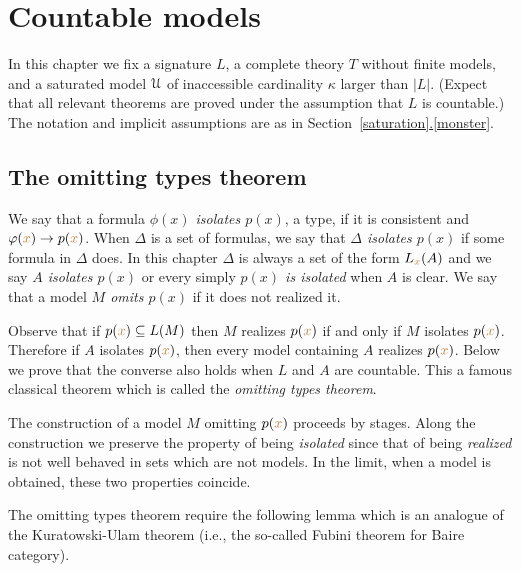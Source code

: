 \documentclass[creche.tex]{subfiles}
\begin{document}
\chapter{Countable models}
\label{countable}

\def\ceq#1#2#3{\parbox[b]{30ex}{$\displaystyle #1$}\parbox[b]{6ex}{\hfil$#2$}$\displaystyle #3$}

In this chapter we fix a signature $L$, a complete theory $T$ without finite models, and a saturated model $\EuScript U$ of inaccessible cardinality $\kappa$ larger than $|L|$. (Expect that all relevant theorems are proved under the assumption that $L$ is countable.) The notation and implicit assumptions are as in Section~\hyperref[monster]{\ref*{saturation}.\ref*{monster}}.



\section{The omitting types theorem}\label{omttingtype}

We say that a formula \emph{$\phi(x)$ isolates $p(x)$}, a type, if it is consistent and $\varphi({\color{brown} x})\rightarrow p({\color{brown} x})$. When $\Delta$ is a set of formulas, we say that \emph{$\Delta$ isolates $p(x)$\/} if some formula in $\Delta$ does. In this chapter $\Delta$ is always a set of the form $L_{{\color{brown} x}}(A)$ and we say  \emph{$A$ isolates $p(x)$\/} or every simply \emph{$p(x)$ is isolated\/} when $A$ is clear. We say that a model \emph{$M$ omits $p(x)$\/} if it does not realized it. 

Observe that if $p({\color{brown} x})\subseteq L(M)$ then $M$ realizes $p({\color{brown} x})$ if and only if $M$ isolates  $p({\color{brown} x})$. Therefore if $A$ isolates $p({\color{brown} x})$, then every model containing $A$ realizes $p({\color{brown} x})$. Below we prove that the converse also holds when $L$ and $A$ are countable. This a famous classical theorem  which is called the \textit{omitting types theorem}. 

The construction of a model $M$ omitting $p({\color{brown} x})$ proceeds by stages. Along the construction we preserve the property of being {\em isolated\/}  since that of being {\em realized\/} is not well behaved in sets which are not models. In the limit, when a model is obtained, these two properties coincide. 

The omitting types theorem require the following lemma which is an analogue of the Kura\-towski-Ulam theorem (i.e., the so-called Fubini theorem for Baire category).
\end{document}
